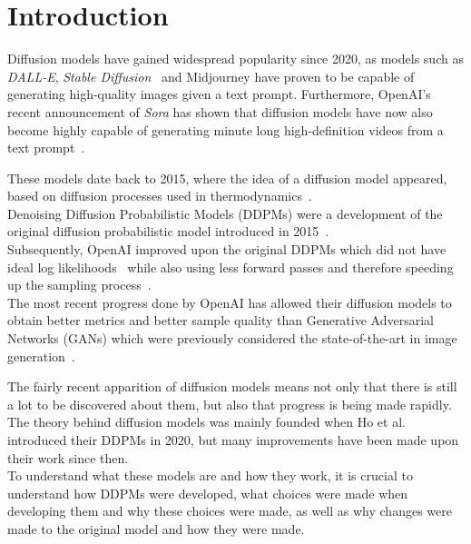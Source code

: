 \documentclass[twoside]{article}
\numberwithin{equation}{section}
\numberwithin{figure}{section}
\begin{document}
\newpage
\tableofcontents



\newpage
\section{Introduction}
Diffusion models have gained widespread popularity since 2020, as models such as \textit{DALL-E}, \textit{Stable Diffusion}~\cite{stablediffusion,rombach2022highresolution} and Midjourney have proven to be capable of generating high-quality images given a text prompt. Furthermore, OpenAI's recent announcement of \textit{Sora} has shown that diffusion models have now also become highly capable of generating minute long high-definition videos from a text prompt~\cite{videoworldsimulators2024}.

These models date back to 2015, where the idea of a diffusion model appeared, based on diffusion processes used in thermodynamics~\cite{sohldickstein2015deep}. \\ 
Denoising Diffusion Probabilistic Models (DDPMs) were a development of the original diffusion probabilistic model introduced in 2015~\cite{ho2020denoising}. \\
Subsequently, OpenAI improved upon the original DDPMs which did not have ideal log likelihoods~\cite{ho2020denoising} while also using less forward passes and therefore speeding up the sampling process~\cite{nichol2021improved}. \\
The most recent progress done by OpenAI has allowed their diffusion models to obtain better metrics and better sample quality than Generative Adversarial Networks (GANs) which were previously considered the state-of-the-art in image generation~\cite{dhariwal2021diffusion}.

The fairly recent apparition of diffusion models means not only that there is still a lot to be discovered about them, but also that progress is being made rapidly. \\
The theory behind diffusion models was mainly founded when Ho et al.~\cite{ho2020denoising} introduced their DDPMs in 2020, but many improvements have been made upon their work since then. \\ 
To understand what these models are and how they work, it is crucial to understand how DDPMs were developed, what choices were made when developing them and why these choices were made, as well as why changes were made to the original model and how they were made.
\end{document}
